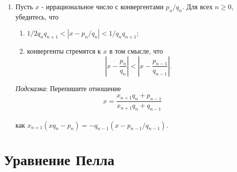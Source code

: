\documentclass[11pt]{article}
\begin{document}
\begin{enumerate}
\item Пусть $x$ - иррациональное число с конвергентами $p_{n}/q_{n}$. Для всех $n\geq0$, убедитесь, что 
\begin{enumerate}
\item $ 1/2q_{n}q_{n+1}<|x-p_{n}/q_{n}|<1/q_{n}q_{n+1}$; 
\item конвергенты стремятся к $x$ в том смысле, что \[|x-\frac{p_{n}}{q_{n}}|<|x-\frac{p_{n-1}}{q_{n-1}}|.\]
\end{enumerate} 
\textit{Подсказка}: Перепишите отношение \[x=\frac{x_{n+1}q_{n}+p_{n-1}}{x_{n+1}q_{n}+q_{n-1}}\] 
\\ как $x_{n+1}(xq_{n}-p_{n})=-q_{n-1}(x-p_{n-1}/q_{n-1}).$

 
\end{enumerate}

\newpage
		
\section{Уравнение Пелла}
\end{document}
